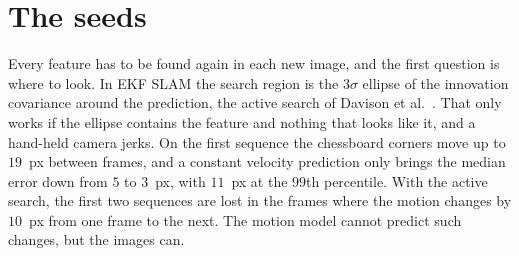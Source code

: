 \documentclass[11pt]{article}
\begin{document}
\section{The seeds}
\label{sec:flow}

Every feature has to be found again in each new image, and the first question is where to look. In
EKF SLAM the search region is the $3\sigma$ ellipse of the innovation covariance around the
prediction, the active search of Davison et al.~\cite{davison2007}. That only works if the ellipse
contains the feature and nothing that looks like it, and a hand-held camera jerks. On the first
sequence the chessboard corners move up to $19$~px between frames, and a constant velocity
prediction only brings the median error down from $5$ to $3$~px, with $11$~px at the $99$th
percentile. With the active search, the first two sequences are lost in the frames where the motion
changes by $10$~px from one frame to the next. The motion model cannot predict such changes, but
the images can.
\end{document}

